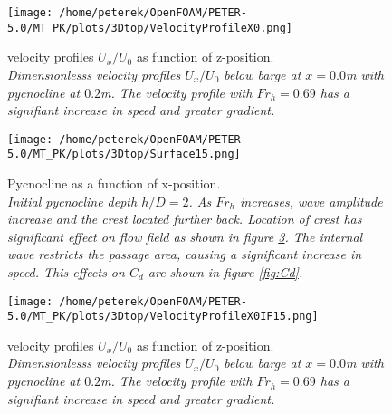 \documentclass[a4paper, 12pt]{report}
\begin{document}
\vspace{2ex}
\begin{minipage}[t]{.45\textwidth}
	\begin{figure}[H]
		\centering
		\texttt{[image: /home/peterek/OpenFOAM/PETER-5.0/MT\_PK/plots/3Dtop/VelocityProfileX0.png]}
		\caption{velocity profiles $U_x/U_0$ as function of z-position. \\ \textit{Dimensionlesss velocity profiles $U_x/U_0$ below barge at $x = 0.0$m with pycnocline at $0.2$m. The velocity profile with $Fr_h = 0.69$ has a signifiant increase in speed and greater gradient.}}
		\label{fig:velocityProfileX0}
	\end{figure}
\end{minipage}\hfill
\vspace{2ex}
\begin{minipage}[t]{.45\textwidth} 
	\begin{figure}[H]
		\centering
		\texttt{[image: /home/peterek/OpenFOAM/PETER-5.0/MT\_PK/plots/3Dtop/Surface15.png]}
		\caption{Pycnocline as a function of x-position. \\ \textit{Initial pycnocline depth $h/D=2$. As $Fr_h$ increases, wave amplitude increase and the crest located further back. Location of crest has significant effect on flow field as shown in figure \ref{fig:velocityProfileX0If15}. The internal wave restricts the passage area, causing a significant increase in speed. This effects on $C_d$ are shown in figure \ref{fig:Cd}.}}
		\label{fig:eta2}
	\end{figure}
\end{minipage}\hfill
\vspace{2ex}
\begin{minipage}[t]{.45\textwidth}
	\begin{figure}[H]
		\centering
		\texttt{[image: /home/peterek/OpenFOAM/PETER-5.0/MT\_PK/plots/3Dtop/VelocityProfileX0IF15.png]}
		\caption{velocity profiles $U_x/U_0$ as function of z-position. \\ \textit{Dimensionlesss velocity profiles $U_x/U_0$ below barge at $x = 0.0$m with pycnocline at $0.2$m. The velocity profile with $Fr_h = 0.69$ has a signifiant increase in speed and greater gradient.}}
		\label{fig:velocityProfileX0If15}
	\end{figure}
\end{minipage}\hfill
\vspace{2ex}\\
\\
\end{document}
